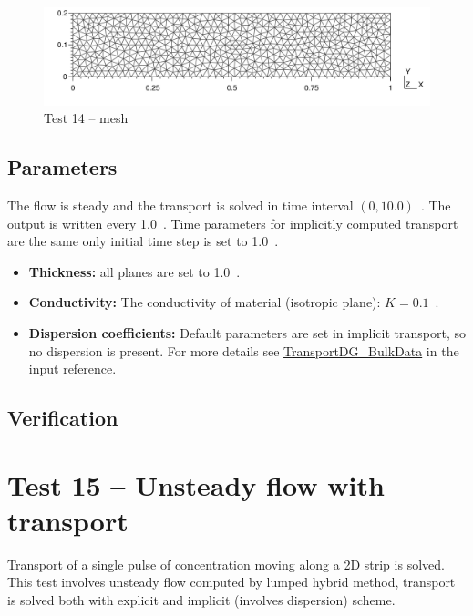 \begin{figure}[htb!]
\centering
\includegraphics[width=15cm]{tests_graphics/14_mesh.pdf}
\caption{Test 14 -- mesh}
\label{fig:test14_mesh}
\end{figure}
%
%
\subsection*{Parameters}
The flow is steady and the transport is solved in time interval $(0,10.0)$~. The output is written every 
1.0~. Time parameters for implicitly computed transport are the same only initial time step is set to 1.0~.
%
\begin{itemize}
  \item \textbf{Thickness:} all planes are set to 1.0~.
  \item \textbf{Conductivity:} The conductivity of material (isotropic plane): $K=0.1$~.
  \item \textbf{Dispersion coefficients:} Default parameters are set in implicit transport, so no dispersion is present. 
        For more details see \hyperlink{IT::TransportDG-BulkData}{TransportDG\_BulkData} in the input reference.
\end{itemize}
%

\subsection*{Verification}




\section{Test 15 -- Unsteady flow with transport}
Transport of a single pulse of concentration moving along a 2D strip is solved. This test involves unsteady flow computed by lumped hybrid method, transport is solved both with explicit and implicit (involves dispersion) scheme.
 
